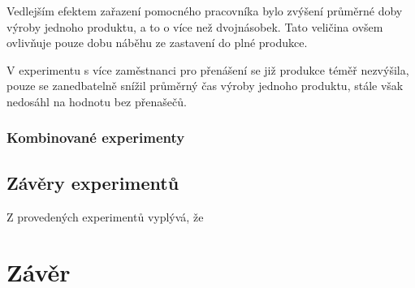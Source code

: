 \documentclass[11pt, a4paper]{article}
\begin{document}
Vedlejším efektem zařazení pomocného pracovníka bylo zvýšení průměrné doby výroby jednoho produktu, a to o více než dvojnásobek. Tato veličina ovšem ovlivňuje pouze dobu náběhu ze zastavení do plné produkce.


V experimentu s více zaměstnanci pro přenášení se již produkce téměř nezvýšila, pouze se zanedbatelně snížil průměrný čas výroby jednoho produktu, stále však nedosáhl na hodnotu bez přenašečů.

\subsubsection{Kombinované experimenty}

\subsection{Závěry experimentů}
Z provedených experimentů vyplývá, že


\section{Závěr}
\end{document}
